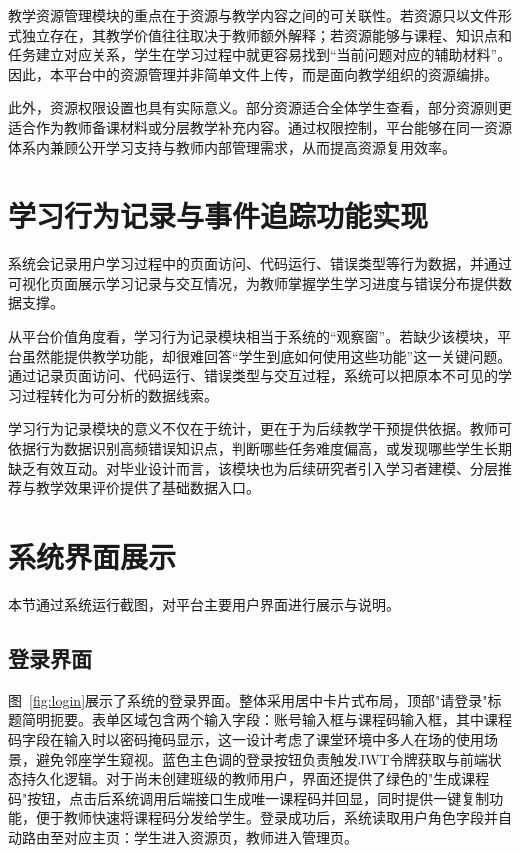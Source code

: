 教学资源管理模块的重点在于资源与教学内容之间的可关联性。若资源只以文件形式独立存在，其教学价值往往取决于教师额外解释；若资源能够与课程、知识点和任务建立对应关系，学生在学习过程中就更容易找到“当前问题对应的辅助材料”。因此，本平台中的资源管理并非简单文件上传，而是面向教学组织的资源编排。

此外，资源权限设置也具有实际意义。部分资源适合全体学生查看，部分资源则更适合作为教师备课材料或分层教学补充内容。通过权限控制，平台能够在同一资源体系内兼顾公开学习支持与教师内部管理需求，从而提高资源复用效率。

\section{学习行为记录与事件追踪功能实现}
系统会记录用户学习过程中的页面访问、代码运行、错误类型等行为数据，并通过可视化页面展示学习记录与交互情况，为教师掌握学生学习进度与错误分布提供数据支撑。

从平台价值角度看，学习行为记录模块相当于系统的“观察窗”。若缺少该模块，平台虽然能提供教学功能，却很难回答“学生到底如何使用这些功能”这一关键问题。通过记录页面访问、代码运行、错误类型与交互过程，系统可以把原本不可见的学习过程转化为可分析的数据线索。

学习行为记录模块的意义不仅在于统计，更在于为后续教学干预提供依据。教师可依据行为数据识别高频错误知识点，判断哪些任务难度偏高，或发现哪些学生长期缺乏有效互动。对毕业设计而言，该模块也为后续研究者引入学习者建模、分层推荐与教学效果评价提供了基础数据入口\cite{tsai2021cts}。

\section{系统界面展示}
本节通过系统运行截图，对平台主要用户界面进行展示与说明。

\subsection{登录界面}
图~\ref{fig:login}展示了系统的登录界面。整体采用居中卡片式布局，顶部"请登录"标题简明扼要。表单区域包含两个输入字段：账号输入框与课程码输入框，其中课程码字段在输入时以密码掩码显示，这一设计考虑了课堂环境中多人在场的使用场景，避免邻座学生窥视。蓝色主色调的登录按钮负责触发JWT令牌获取与前端状态持久化逻辑。对于尚未创建班级的教师用户，界面还提供了绿色的"生成课程码"按钮，点击后系统调用后端接口生成唯一课程码并回显，同时提供一键复制功能，便于教师快速将课程码分发给学生。登录成功后，系统读取用户角色字段并自动路由至对应主页：学生进入资源页，教师进入管理页。

